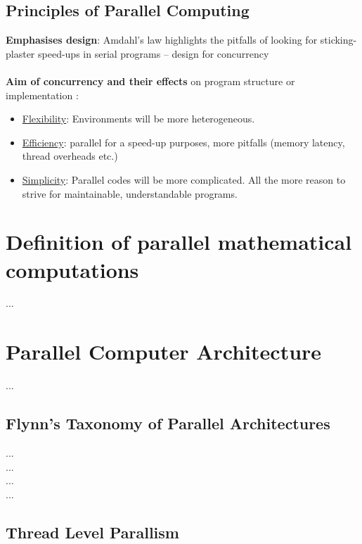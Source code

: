 \newpage

\subsection{Principles of Parallel Computing}

\textbf{Emphasises design}:
Amdahl's law highlights the pitfalls of looking for
sticking-plaster speed-ups in serial programs –
design for concurrency \parencite[see][p4]{article6}
\\\\\textbf{Aim of concurrency and their effects} on program structure or implementation \parencite[see][p5]{article6}:
\begin{itemize}
  \item \underline{Flexibility}: Environments will be more heterogeneous.
  \item \underline{Efficiency}:	parallel for a speed-up purposes, more pitfalls (memory latency, thread overheads etc.)
  \item \underline{Simplicity}:	Parallel codes will be more complicated. All the more reason to strive for maintainable, understandable programs.
\end{itemize}

\newpage

\section{Definition of parallel mathematical computations}

...\newpage

\section{Parallel Computer Architecture}

...

\subsection{Flynn's Taxonomy of Parallel Architectures}

...\parencite[see][p5]{internet1}\\
...\parencite[see][p13]{book1}\\
...\parencite[see][p4]{book5}\\
...\parencite[see][p2]{book6}

\subsection{Thread Level Parallism}

